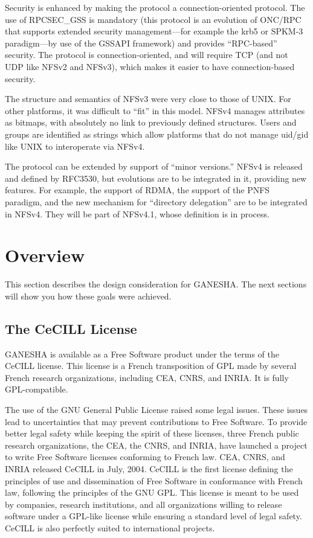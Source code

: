 \documentclass[final]{ols}
\begin{document}
Security is enhanced by making the protocol a connection-oriented
protocol. The use of RPCSEC\_GSS is mandatory (this protocol is an
evolution of ONC/RPC that supports extended security management---for
example the krb5 or SPKM-3 paradigm---by use of the GSSAPI framework)
and provides ``RPC-based'' security. The protocol is
connection-oriented, and will require TCP (and not UDP like NFSv2 and
NFSv3), which makes it easier to have connection-based security.

The structure and semantics of NFSv3 were very close to those of UNIX.
For other platforms, it was difficult to ``fit'' in this model. NFSv4
manages attributes as bitmaps, with absolutely no link to previously
defined structures. Users and groups are identified as strings which
allow platforms that do not manage uid/gid like UNIX to interoperate
via NFSv4.

The protocol can be extended by support of ``minor versions.'' NFSv4 is
released and defined by RFC3530, but evolutions are to be integrated
in it, providing new features. For example, the support of RDMA, the
support of the PNFS paradigm, and the new mechanism for ``directory
delegation'' are to be integrated in NFSv4. They will be part of NFSv4.1,
whose definition is in process.

\section{Overview}
This section describes the design consideration for GANESHA. The next
sections will show you how these goals were achieved.

\subsection{The CeCILL License}
GANESHA is available as a Free Software product under the terms of the
CeCILL license. This license is a French transposition of GPL made by
several French research organizations, including CEA, CNRS, and INRIA.
It is fully GPL-compatible.

The use of the GNU General Public License raised some legal issues.
These issues lead to uncertainties that may prevent contributions to Free
Software.  To provide better legal safety while keeping the spirit
of these licenses, three French public research organizations, the
CEA, the CNRS, and INRIA, have launched a project to write Free Software
licenses conforming to French law.  CEA, CNRS, and INRIA released
CeCILL in July, 2004. CeCILL is the first license defining the
principles of use and dissemination of Free Software in conformance
with French law, following the principles of the GNU GPL. This license
is meant to be used by companies, research institutions, and all
organizations willing to release software under a GPL-like license
while ensuring a standard level of legal safety. CeCILL is also
perfectly suited to international projects.
\end{document}
